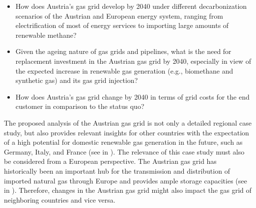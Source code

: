 \begin{itemize}
	\item How does Austria's gas grid develop by 2040 under different decarbonization scenarios of the Austrian and European energy system, ranging from electrification of most of energy services to importing large amounts of renewable methane?
	\item Given the ageing nature of gas grids and pipelines, what is the need for replacement investment in the Austrian gas grid by 2040, especially in view of the expected increase in renewable gas generation (e.g., biomethane and synthetic gas) and its gas grid injection?
	\item How does Austria's gas grid change by 2040 in terms of grid costs for the end customer in comparison to the status quo?
\end{itemize}

The proposed analysis of the Austrian gas grid is not only a detailed regional case study, but also provides relevant insights for other countries with the expectation of a high potential for domestic renewable gas generation in the future, such as Germany, Italy, and France (see in \cite{scarlat2018biogas}). The relevance of this case study must also be considered from a European perspective. The Austrian gas grid has historically been an important hub for the transmission and distribution of imported natural gas through Europe and provides ample storage capacities (see in \cite{sesini2021strategic}). Therefore, changes in the Austrian gas grid might also impact the gas grid of neighboring countries and vice versa.\vspace{0.3cm}

